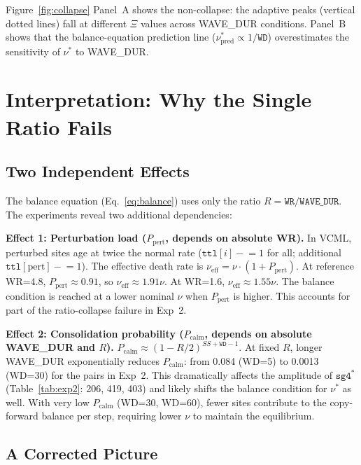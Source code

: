 \documentclass[11pt]{article}
\theoremstyle{remark}
\begin{document}
Figure~\ref{fig:collapse} Panel~A shows the non-collapse: the adaptive peaks
(vertical dotted lines) fall at different $\Xi$ values across WAVE\_DUR conditions.
Panel~B shows that the balance-equation prediction line ($\nu^*_{\text{pred}}
\propto 1/\mathtt{WD}$) overestimates the sensitivity of $\nu^*$ to WAVE\_DUR.

\section{Interpretation: Why the Single Ratio Fails}
\label{sec:interp}

\subsection{Two Independent Effects}

The balance equation (Eq.~\eqref{eq:balance}) uses only the ratio
$R = \mathtt{WR}/\mathtt{WAVE\_DUR}$. The experiments reveal two additional
dependencies:

\textbf{Effect 1: Perturbation load ($P_{\text{pert}}$, depends on absolute WR).}
In VCML, perturbed sites age at twice the normal rate
($\mathtt{ttl}[i] \mathrel{-}= 1$ for all; additional $\mathtt{ttl}[\text{pert}]
\mathrel{-}= 1$). The effective death rate is $\nu_{\text{eff}} = \nu \cdot
(1 + P_{\text{pert}})$. At reference WR=4.8, $P_{\text{pert}} \approx 0.91$,
so $\nu_{\text{eff}} \approx 1.91\nu$. At WR=1.6, $\nu_{\text{eff}} \approx
1.55\nu$. The balance condition is reached at a lower nominal $\nu$ when
$P_{\text{pert}}$ is higher. This accounts for part of the ratio-collapse
failure in Exp~2.

\textbf{Effect 2: Consolidation probability ($P_{\text{calm}}$, depends on
absolute WAVE\_DUR and $R$).}
$P_{\text{calm}} \approx (1-R/2)^{SS+\mathtt{WD}-1}$. At fixed $R$, longer
WAVE\_DUR exponentially reduces $P_{\text{calm}}$: from 0.084 (WD=5) to
0.0013 (WD=30) for the pairs in Exp~2. This dramatically affects the amplitude
of $\mathtt{sg4}^*$ (Table~\ref{tab:exp2}: 206, 419, 403) and likely shifts
the balance condition for $\nu^*$ as well. With very low $P_{\text{calm}}$
(WD=30, WD=60), fewer sites contribute to the copy-forward balance per step,
requiring lower $\nu$ to maintain the equilibrium.

\subsection{A Corrected Picture}
\end{document}
